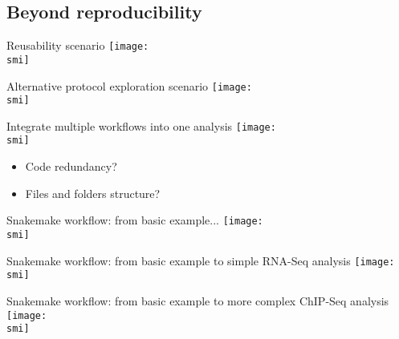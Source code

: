 \documentclass[10pt]{beamer}
\def\smi{out/ln/updir/mw-gcthesis-oral/library.bib}
\begin{document}
    \subsection{Beyond reproducibility}
    \begin{frame}{Reusability scenario}
      \def\smi{out/ln/updir/mw-gcthesis-oral/ink/reproducibility/arrow_reproducibility_exchange_data.pdf}
      \texttt{[image: \\smi]}
    \end{frame}
    \begin{frame}{Alternative protocol exploration scenario}
      \def\smi{out/ln/updir/mw-gcthesis-oral/ink/reproducibility/arrow_reproducibility_alternative_protocol.pdf}
      \texttt{[image: \\smi]}
    \end{frame}
    \begin{frame}{Integrate multiple workflows into one analysis}
      \def\smi{out/ln/updir/mw-gcthesis-oral/ink/reproducibility/arrow_reproducibility_integration.pdf}
      \texttt{[image: \\smi]}
      \begin{multicols}{2}
        \begin{itemize}
          \item Code redundancy? %
          \item Files and folders structure?
        \end{itemize}
      \end{multicols}
    \end{frame}
    \begin{frame}{Snakemake workflow: from basic example...}
      \def\smi{out/ln/updir/mw-gcthesis-oral/ink/snakemake/simple_workflow.pdf}
      \texttt{[image: \\smi]}
    \end{frame}
    \begin{frame}{Snakemake workflow: from basic example to simple RNA-Seq analysis}
      \def\smi{out/ln/updir/mw-gcthesis-oral/ink/snakemake/rna-seq-star-deseq2.png}
      \texttt{[image: \\smi]}
    \end{frame}
    \begin{frame}{Snakemake workflow: from basic example to more complex ChIP-Seq analysis}
      \def\smi{out/ln/updir/mw-gcthesis-oral/ink/snakemake/snakechunk.png}
      \texttt{[image: \\smi]}
    \end{frame}
\end{document}
